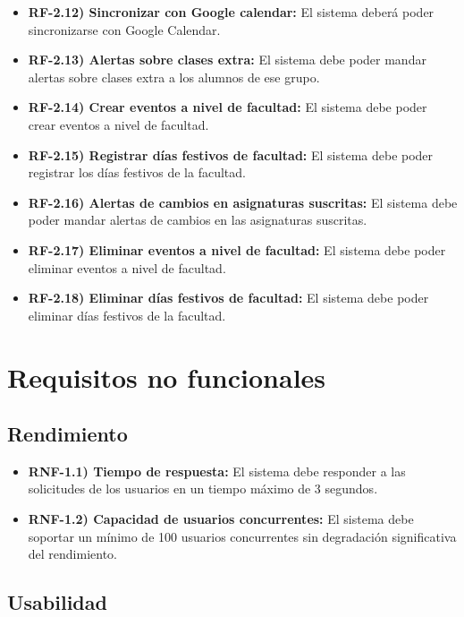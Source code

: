 \begin{itemize}
\begin{itemize}
        \item \textbf{RF-2.12) Sincronizar con Google calendar:} El sistema deberá poder sincronizarse con Google Calendar.
        \item \textbf{RF-2.13) Alertas sobre clases extra:} El sistema debe poder mandar alertas sobre clases extra a los alumnos de ese grupo.
        \item \textbf{RF-2.14) Crear eventos a nivel de facultad:} El sistema debe poder crear eventos a nivel de facultad.
        \item \textbf{RF-2.15) Registrar días festivos de facultad:} El sistema debe poder registrar los días festivos de la facultad.
        \item \textbf{RF-2.16) Alertas de cambios en asignaturas suscritas:} El sistema debe poder mandar alertas de cambios en las asignaturas suscritas.
        \item \textbf{RF-2.17) Eliminar eventos a nivel de facultad:} El sistema debe poder eliminar eventos a nivel de facultad.
        \item \textbf{RF-2.18) Eliminar días festivos de facultad:} El sistema debe poder eliminar días festivos de la facultad.
    \end{itemize}
\end{itemize}

\section{Requisitos no funcionales}

\subsection{Rendimiento}

\begin{itemize}
    \item \textbf{RNF-1.1) Tiempo de respuesta:} El sistema debe responder a las solicitudes de los usuarios en un tiempo máximo de 3 segundos.
    \item \textbf{RNF-1.2) Capacidad de usuarios concurrentes:} El sistema debe soportar un mínimo de 100 usuarios concurrentes sin degradación significativa del rendimiento.
\end{itemize}

\subsection{Usabilidad}

